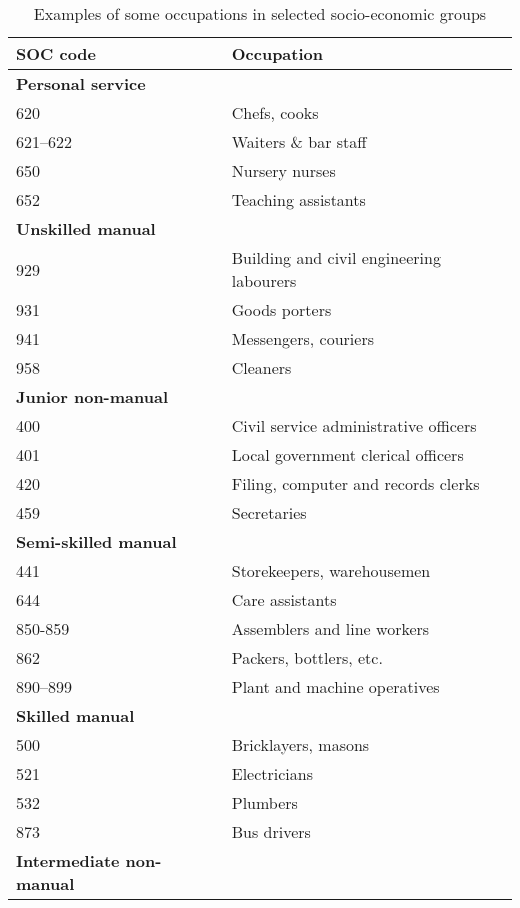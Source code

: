 \documentclass[a4paper,11pt,titlepage]{article}
\begin{document}
\begin{table}[hb]\caption{Examples of some occupations in selected socio-economic groups \label{tab:occs}}
\begin{tabular}{ll}
\toprule
SOC code & Occupation \\
\midrule
\textbf{Personal service} \\
620 & Chefs, cooks \\
621--622 & Waiters \& bar staff \\
650 & Nursery nurses \\
652 & Teaching assistants \\
\textbf{Unskilled manual} \\
929 & Building and civil engineering labourers \\
931 & Goods porters \\
941 & Messengers, couriers \\
958 & Cleaners \\
\textbf{Junior non-manual} \\
400 & Civil service administrative officers \\
401 & Local government clerical officers \\
420 & Filing, computer and records clerks \\
459 & Secretaries \\
\textbf{Semi-skilled manual} \\
441 & Storekeepers, warehousemen \\
644 & Care assistants\\
850-859 & Assemblers and line workers \\
862 & Packers, bottlers, etc. \\
890--899 & Plant and machine operatives \\
\textbf{Skilled manual}\\
500 & Bricklayers, masons \\
521 & Electricians \\
532 & Plumbers \\
873 & Bus drivers \\
\textbf{Intermediate non-manual}\\

\end{tabular}
\end{table}
\end{document}

